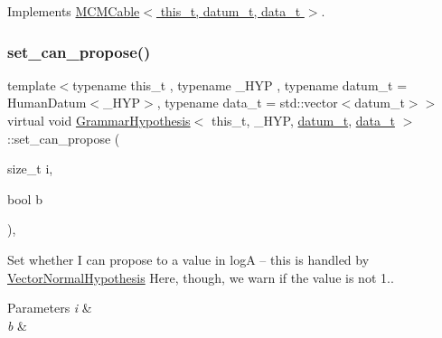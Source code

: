 Implements \hyperlink{class_m_c_m_cable_aa7017e18b4a1508bc4cff90fb82a8ec1}{M\+C\+M\+Cable$<$ this\+\_\+t, datum\+\_\+t, data\+\_\+t $>$}.

\mbox{\label{class_grammar_hypothesis_af658323081d132788bb5bebbd07c93e8}} 
\subsubsection{\texorpdfstring{set\+\_\+can\+\_\+propose()}{set\_can\_propose()}}
{\footnotesize\ttfamily template$<$typename this\+\_\+t , typename \+\_\+\+H\+YP , typename datum\+\_\+t  = Human\+Datum$<$\+\_\+\+H\+Y\+P$>$, typename data\+\_\+t  = std\+::vector$<$datum\+\_\+t$>$$>$ \\
virtual void \hyperlink{class_grammar_hypothesis}{Grammar\+Hypothesis}$<$ this\+\_\+t, \+\_\+\+H\+YP, \hyperlink{class_bayesable_a9f1a6c0cd7855550fa10b1a8f13a5867}{datum\+\_\+t}, \hyperlink{class_bayesable_aa2788c4d7718c0a824e1d28c4c98f921}{data\+\_\+t} $>$\+::set\+\_\+can\+\_\+propose (\begin{DoxyParamCaption}\item[{size\+\_\+t}]{i,  }\item[{bool}]{b }\end{DoxyParamCaption})\hspace{0.3cm}{\ttfamily [inline]}, {\ttfamily [virtual]}}



Set whether I can propose to a value in logA -- this is handled by \hyperlink{class_vector_normal_hypothesis}{Vector\+Normal\+Hypothesis} Here, though, we warn if the value is not 1.. 


\begin{DoxyParams}{Parameters}
{\em i} & \\
\hline
{\em b} & \\
\hline
\end{DoxyParams}
\mbox{\label{class_grammar_hypothesis_a4073539c064e62f00e77998a04a693cb}} 
